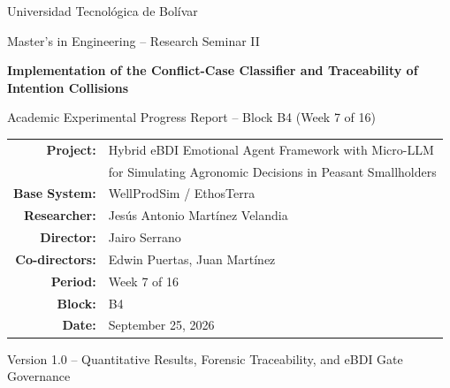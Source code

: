 \documentclass[11pt,a4paper]{article}
\begin{document}
\begin{titlepage}
    \centering
    \vspace*{1.5cm}

    {\large Universidad Tecnológica de Bolívar\par}
    \vspace{0.3cm}
    {\normalsize Master's in Engineering -- Research Seminar II\par}

    \vspace{2.2cm}
    {\LARGE\bfseries Implementation of the Conflict-Case Classifier and Traceability of Intention Collisions\par}
    \vspace{0.5cm}
    {\large Academic Experimental Progress Report -- Block B4 (Week 7 of 16)\par}

    \vspace{2.2cm}
    \begin{tabular}{rl}
        \textbf{Project:} & Hybrid eBDI Emotional Agent Framework with Micro-LLM \\
                          & for Simulating Agronomic Decisions in Peasant Smallholders \\
        \textbf{Base System:} & WellProdSim / EthosTerra \\
        \textbf{Researcher:} & Jesús Antonio Martínez Velandia \\
        \textbf{Director:} & Jairo Serrano \\
        \textbf{Co-directors:} & Edwin Puertas, Juan Martínez \\
        \textbf{Period:} & Week 7 of 16 \\
        \textbf{Block:} & B4 \\
        \textbf{Date:} & September 25, 2026 \\
    \end{tabular}

    \vfill
    {\small Version 1.0 -- Quantitative Results, Forensic Traceability, and eBDI Gate Governance\par}
    \vspace*{1cm}
\end{titlepage}

\newpage
\tableofcontents
\newpage
\end{document}
